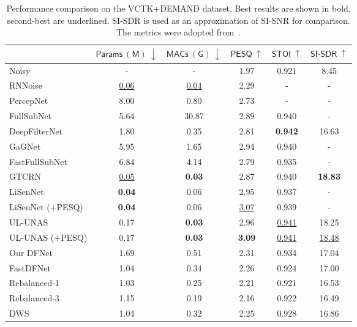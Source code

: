 \documentclass[a4paper,12pt]{extarticle}
\begin{document}
\begin{table}[h]
	\caption{Performance comparison on the VCTK+DEMAND dataset. Best results are shown in bold, second-best are underlined. SI-SDR is used as an approximation of SI-SNR for comparison. The metrics were adopted from~\cite{ulunas}.}
	\label{table:other}
	\footnotesize
	\centering
	\begin{tabular}{lccccc}
	\toprule
	& $\mathsf{Params\ (M)\ \downarrow}$ 
	& $\mathsf{MACs\ (G)\ \downarrow}$ 
	& $\mathsf{PESQ\ \uparrow}$ 
	& $\mathsf{STOI\ \uparrow}$ 
	& $\mathsf{SI\text{-}SDR\ \uparrow}$\\
	\midrule
	Noisy           & -      & -      & 1.97      & 0.921 & 8.45 \\
	RNNoise         & \underline{0.06}   & \underline{0.04}   & 2.29      & -     & - \\
	PercepNet       & 8.00   & 0.80   & 2.73      & -     & - \\
	FullSubNet      & 5.64   & 30.87  & 2.89      & 0.940 & - \\
	DeepFilterNet   & 1.80   & 0.35   & 2.81      & \bf{0.942} & 16.63 \\
	GaGNet          & 5.95   & 1.65   & 2.94      & 0.940 & - \\
	FastFullSubNet  & 6.84   & 4.14   & 2.79      & 0.935 & - \\
	GTCRN           & \underline{0.05}   & \bf{0.03} & 2.87 & 0.940 & \bf{18.83} \\
	LiSenNet        & \bf{0.04} & 0.06 & 2.95 & 0.937 & - \\
	LiSenNet (+PESQ)& \bf{0.04} & 0.06 & \underline{3.07} & 0.939 & - \\
	UL-UNAS         & 0.17   & \bf{0.03} & 2.96 & \underline{0.941} & 18.25 \\
	UL-UNAS (+PESQ) & 0.17   & \bf{0.03} & \bf{3.09} & \underline{0.941} & \underline{18.48} \\
	\midrule
	Our DFNet       & 1.69   & 0.51   & 2.31      & 0.934  & 17.04 \\
	FastDFNet       & 1.04   & 0.34   & 2.26      & 0.924  & 17.00 \\
	Rebalanced-1    & 1.03   & 0.25   & 2.21      & 0.921  & 16.53 \\
	Rebalanced-3    & 1.15   & 0.19   & 2.16      & 0.922  & 16.49 \\
	DWS        & 1.04   & 0.32   & 2.25      & 0.928  & 16.86 \\
	\bottomrule
	\end{tabular}
\end{table}
\end{document}
